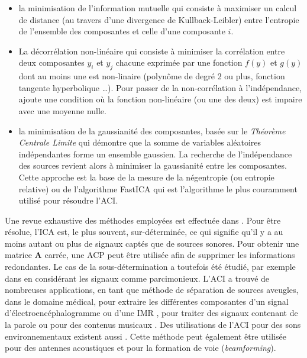 \begin{itemize}
\item la minimisation de l'information mutuelle \cite{hyvarinen97independentcomponent} qui consiste à maximiser un calcul de distance (au travers d'une divergence de Kullback-Leibler) entre l'entropie de l'ensemble des composantes et celle d'une composante $i$.
\item La décorrélation non-linéaire qui consiste à minimiser la corrélation entre deux composantes $y_i$ et $y_j$ chacune exprimée par une fonction $f(y)$ et $g(y)$ dont au moins une est non-linaire (polynôme de degré 2 ou plus, fonction tangente hyperbolique \dots). Pour passer de la non-corrélation à l'indépendance, \cite{jutten1991blind} ajoute une condition où la fonction non-linéaire (ou une des deux)  est impaire avec une moyenne nulle.
\item la minimisation de la \og gaussianité \fg{} des composantes, basée sur le \textit{Théorème Centrale Limite} qui démontre que la somme de variables aléatoires indépendantes forme un ensemble gaussien. La recherche de l'indépendance des sources revient alors à minimiser la \og gaussianité \fg{} entre les composantes. Cette approche est la base de la mesure de la négentropie (ou entropie relative) \cite{lee2000unifying} ou de l'algorithme FastICA \cite{hyvarinen1999fast} qui est l'algorithme le plus couramment utilisé pour résoudre l'ACI.
\end{itemize}

Une revue exhaustive des méthodes employées est effectuée dans \cite{hyvarinen2004independent}.
Pour être résolue, l'ICA est, le plus souvent, sur-déterminée, ce qui signifie qu'il y a au moins autant ou plus de signaux captés que de sources sonores. Pour obtenir une matrice $\mathbf{A}$ carrée, une ACP peut être utilisée afin de supprimer les informations redondantes.  Le cas de la sous-détermination a toutefois été étudié, par exemple dans \cite{bofill2000blind} en considérant les signaux comme parcimonieux.
L'ACI a trouvé de nombreuses applications, en tant que méthode de séparation de sources aveugles, dans le domaine médical, pour extraire les différentes composantes d'un signal d'électroencéphalogramme \cite{delorme2007enhanced,makeig1996independent} ou d'une IMR \cite{lee1999independent}, pour traiter des signaux contenant de la parole \cite{sarela2005denoising, hsieh2009independent} ou pour des contenus musicaux \cite{uhle2003extraction, abdallah2003independent}. Des utilisations de l'ACI pour des sons environnementaux existent aussi \cite{lombard2011tdoa, eronen2006audio}. Cette méthode peut également être utilisée pour des antennes acoustiques et pour la formation de voie (\textit{beamforming})\cite{cardoso_blind_1998,saruwatari2003blind}.

